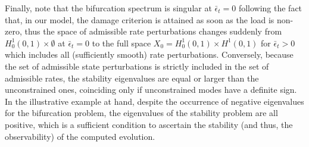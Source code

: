 {    %
}

Finally, note that the bifurcation spectrum is singular at $\bar \epsilon_t=0$ following the fact that, in our model, the damage criterion is attained as soon as the load is non-zero, thus the space of admissible rate perturbations changes suddenly from $H^1_0(0,1) \times \emptyset$ at $\bar \epsilon_t=0$ to the full space $X_0 = H^1_0(0, 1)\times H^1(0, 1)$ for $\bar \epsilon_t>0$ which includes all (sufficiently smooth) rate perturbations.
Conversely, because the set of admissible state perturbations is strictly included in the set of admissible rates, the stability eigenvalues are equal or larger than the unconstrained ones,  coinciding only if unconstrained modes have a definite sign.
In the illustrative example at hand, despite the occurrence of negative eigenvalues for the bifurcation problem, the eigenvalues of the stability problem are all positive, which is a sufficient condition to ascertain the stability (and thus, the observability) of the computed evolution.


